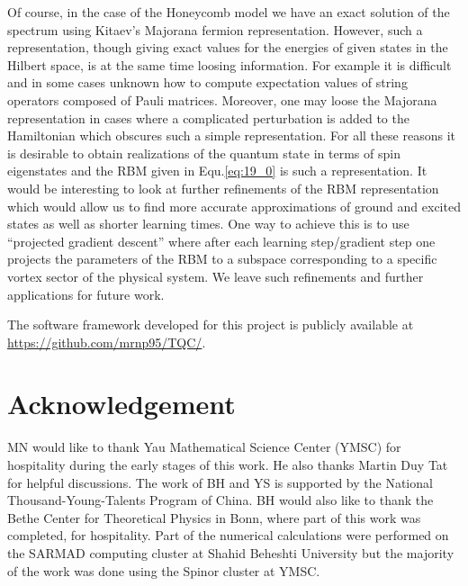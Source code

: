 \documentclass{article}
\begin{document}
Of course, in the case of the Honeycomb model we have an exact solution of the spectrum using Kitaev's Majorana fermion representation. However, such a representation, though giving exact values for the energies of given states in the Hilbert space, is at the same time loosing information. For example it is difficult and in some cases unknown how to compute expectation values of string operators composed of Pauli matrices. Moreover, one may loose the Majorana representation in cases where a complicated perturbation is added to the Hamiltonian which obscures such a simple representation. For all these reasons it is desirable to obtain realizations of the quantum state in terms of spin eigenstates and the RBM given in Equ.\hspace{0.2mm}\ref{eq:19_0} is such a representation. It would be interesting to look at further refinements of the RBM representation which would allow us to find more accurate approximations of ground and excited states as well as shorter learning times. One way to achieve this is to use ``projected gradient descent'' where after each learning step/gradient step one projects the parameters of the RBM to a subspace corresponding to a specific vortex sector of the physical system. We leave such refinements and further applications for future work.

The software framework developed for this project is publicly available at \hyperlink{https://github.com/mrnp95/TQC/}{https://github.com/mrnp95/TQC/}.

\section{Acknowledgement}
MN would like to thank Yau Mathematical Science Center (YMSC) for hospitality during the early stages of this work. He also thanks Martin Duy Tat for helpful discussions. The work of BH and YS is supported by the National Thousand-Young-Talents Program of China. BH would also like to thank the Bethe Center for Theoretical Physics in Bonn, where part of this work was completed, for hospitality. Part of the numerical calculations were performed on the SARMAD computing cluster at Shahid Beheshti University but the majority of the work was done using the Spinor cluster at YMSC. 

\end{document}
